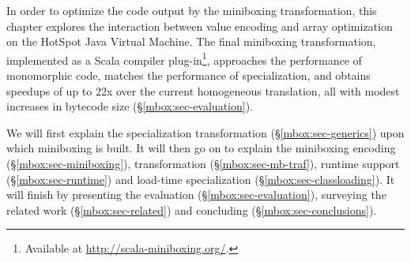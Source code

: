 In order to optimize the code output by the miniboxing transformation, this chapter explores the interaction between value encoding and array optimization on the HotSpot Java Virtual Machine. The final miniboxing transformation, implemented as a Scala compiler plug-in\footnote{Available at \url{http://scala-miniboxing.org/}.}, approaches the performance of monomorphic code, matches the performance of specialization, and obtains speedups of up to 22x over the current homogeneous translation, all with modest increases in bytecode size (\S{}\ref{mbox:sec-evaluation}).

We will first explain the specialization transformation (\S\ref{mbox:sec-generics}) upon which miniboxing is built. It will then go on to explain the miniboxing encoding (\S\ref{mbox:sec-miniboxing}), transformation (\S\ref{mbox:sec-mb-traf}), runtime support (\S\ref{mbox:sec-runtime}) and load-time specialization (\S\ref{mbox:sec-classloading}). It will finish by presenting the evaluation (\S\ref{mbox:sec-evaluation}), surveying the related work (\S\ref{mbox:sec-related}) and concluding (\S\ref{mbox:sec-conclusions}).  
